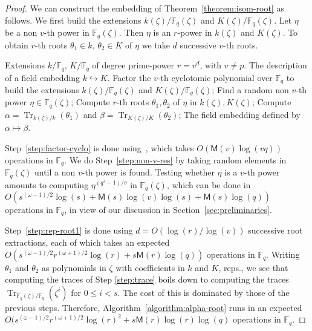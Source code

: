 \documentclass{mcom-l}
\theoremstyle{plain}
\theoremstyle{definition}
\DeclareMathOperator{\trace}{Tr} %
\newcommand{\F}{\ensuremath{\mathbb{F}}}
\newcommand{\MM}{\ensuremath{\mathsf{M}}}
\newcounter{algorithm}
\begin{document}
\begin{proof}
We can construct the embedding of Theorem~\ref{theorem:isom-root} as
follows. We first build the extensions $k(\zeta) / \F_q(\zeta)$ and
$K(\zeta)/\F_q(\zeta)$. Let $\eta$ be a non $v$-th power in
$\F_q(\zeta)$.  Then $\eta$ is an $r$-power in $k(\zeta)$ and
$K(\zeta)$. To obtain $r$-th roots $\theta_1\in k$, $\theta_2\in K$ of
$\eta$ we take $d$ successive $v$-th roots.

\begin{algorithm}
	\label{algorithm:alpha-root}
	\begin{algorithmic}[1]
		\REQUIRE Extensions $k / \F_q$, $K/\F_q$ of degree prime-power $r = v^d$, with $v\ne p$.
		\ENSURE The description of a field embedding $k\hookrightarrow K$.
		\STATE\label{step:factor-cyclo} Factor the $v$-th cyclotomic polynomial over $\F_q$ to 
		build the extensions $k(\zeta) / \F_q(\zeta)$ and $K(\zeta)/\F_q(\zeta)$;
		\STATE\label{step:non-v-res} Find a random non $v$-th power $\eta \in \F_q(\zeta)$;
		\STATE\label{step:rep-root1} Compute $r$-th roots $\theta_1,\theta_2$ of $\eta$ in $k(\zeta),K(\zeta)$;
		\STATE\label{step:trace} Compute $\alpha = \trace_{k(\zeta) / k}(\theta_1)$ and $\beta = 
		\trace_{K(\zeta) / 
		K}(\theta_2)$;
		\RETURN The field embedding defined by $\alpha\mapsto\beta$.
	\end{algorithmic}
\end{algorithm}

Step~\ref{step:factor-cyclo} is done using~\cite[Theorem~9]{shoup94},
which takes $O(\MM(v)\log(vq))$ operations in $\F_q$. We do
Step~\ref{step:non-v-res} by taking random elements in $\F_q(\zeta)$
until a non $v$-th power is found. Testing whether $\eta$ is a $v$-th power
amounts to computing $\eta^{(q^s-1)/v}$ in $\F_q(\zeta)$, which
can be done in $O(s^{(\omega-1)/2}\log(s) + \MM(s)\log(v)\log(s) +
\MM(s)\log(q))$ operations in $\F_q$, in view of our discussion in
Section~\ref{sec:preliminaries}.

Step~\ref{step:rep-root1} is done using $d = O(\log(r) / \log(v))$ successive root extractions, 
each of which takes an expected $O(s^{(\omega-1)/2}r^{(\omega+1)/2}\log(r) + s\MM(r)\log(q))$
operations in $\F_q$. Writing $\theta_1$ and $\theta_2$ as polynomials in $\zeta$ with coefficients 
in $k$ and $K$, reps., we see that computing the traces of Step \ref{step:trace} boils down to 
computing the traces $\trace_{\F_q(\zeta) / \F_q}(\zeta^i)$ for $0 \le i < s$. The cost of this is 
dominated by those of the previous steps. Therefore, Algorithm~\ref{algorithm:alpha-root} runs in 
an expected $O(s^{(\omega-1)/2}r^{(\omega+1)/2}\log(r)^2 + s\MM(r)\log(r)\log(q)$ operations in 
$\F_q$.
\end{proof}
\end{document}
